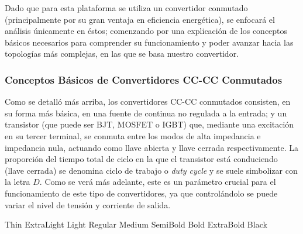 Dado que para esta plataforma se utiliza un convertidor conmutado (principalmente por su gran ventaja en eficiencia energética), se enfocará el análisis únicamente en éstos; comenzando por una explicación de los conceptos básicos necesarios para comprender su funcionamiento y poder avanzar hacia las topologías más complejas, en las que se basa nuestro convertidor.\\

\subsubsection{Conceptos Básicos de Convertidores CC-CC Conmutados}

Como se detalló más arriba, los convertidores CC-CC conmutados consisten, en su forma más básica, en una fuente de continua no regulada a la entrada; y un transistor (que puede ser BJT, MOSFET o IGBT) que, mediante una excitación en su tercer terminal, se conmuta entre los modos de alta impedancia e impedancia nula, actuando como llave abierta y llave cerrada respectivamente. La proporción del tiempo total de ciclo en la que el transistor está conduciendo (llave cerrada) se denomina ciclo de trabajo o \textit{duty cycle} y se suele simbolizar con la letra $D$. Como se verá más adelante, este es un parámetro crucial para el funcionamiento de este tipo de convertidores, ya que controlándolo se puede variar el nivel de tensión y corriente de salida.\\


\begin{center}
    {\Thin Thin} {\ExtraLight ExtraLight} {\Light Light} Regular {\Medium Medium}  {\SemiBold SemiBold} {\Bold Bold} {\ExtraBold ExtraBold} {\Black Black}
\end{center}